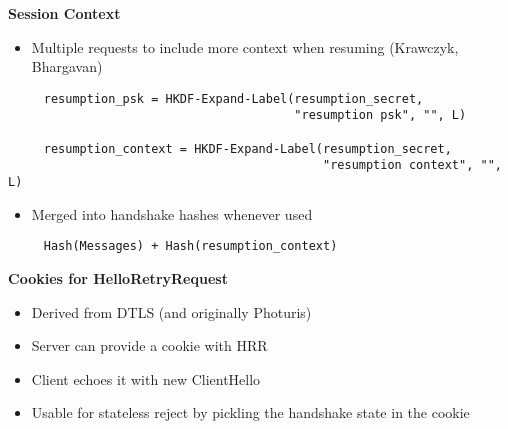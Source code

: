 \documentclass[helvetica]{seminar}
\newcommand{\heading}[1]{%
  \begin{center} 
    \large\bf 
    #1 
  \end{center} 
  \vspace{.4 in}}
\begin{document}
\begin{slide}
\heading{Session Context}

\begin{itemize}
\item Multiple requests to include more context when resuming (Krawczyk, Bhargavan)
\end{itemize}

{\footnotesize
\begin{verbatim}
     resumption_psk = HKDF-Expand-Label(resumption_secret,
                                        "resumption psk", "", L)

     resumption_context = HKDF-Expand-Label(resumption_secret,
                                            "resumption context", "", L)
\end{verbatim}
}

\begin{itemize}
\item Merged into handshake hashes whenever used
\end{itemize}

{\footnotesize
\begin{verbatim}
     Hash(Messages) + Hash(resumption_context)
\end{verbatim}
}
\end{slide}


\begin{slide}
\heading{Cookies for HelloRetryRequest}

\begin{itemize}
\item Derived from DTLS (and originally Photuris)
\item Server can provide a cookie with HRR 
\item Client echoes it with new ClientHello
\item Usable for stateless reject by pickling the handshake state in the cookie
\end{itemize}
\end{slide}
\end{document}

